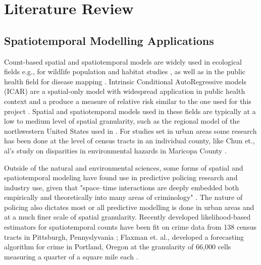 
\chapter{Literature Review}
\label{literature_review}

\section{Spatiotemporal Modelling Applications}

Count-based spatial and spatiotemporal models are widely used in ecological fields e.g., for wildlife population and habitat studies \cite{cobi_2008}, as well as in the public health field for disease mapping \cite{schrodle_2011}. Intrinsic  Conditional AutoRegressive models (ICAR) are a spatial-only model with widespread application in public health context and a produce a measure of relative risk similar to the one used for this project \cite{wakefield2006disease}.   Spatial and spatiotemporal models used in these fields are typically at a low to medium level of spatial granularity, such as the regional model of the northwestern United States used in \cite{cobi_2008}. For studies set in urban areas some research has been done at the level of census tracts in an individual county, like Chun et., al's study on disparities in environmental hazards in Maricopa County \cite{chun_2012}. \par

Outside of the natural and environmental sciences, some forms of spatial and spatiotemporal modeling have found use in predictive policing research and industry use, given that "space–time interactions are deeply embedded both empirically and theoretically into many areas of criminology" \cite{li_2014}. The nature of policing also dictates most or all predictive modelling is done in urban areas and at a much finer scale of spatial granularity. Recently developed likelihood-based estimators for spatiotemporal counts have been fit on crime data from 138 census tracts in Pittsburgh, Pennyslyvania \cite{liesenfeld_2017}; Flaxman et. al., developed a forecasting algorithm for crime in Portland, Oregon at the granularity of 66,000 cells measuring a quarter of a square mile each \cite{flaxman_2018}.
 \par

